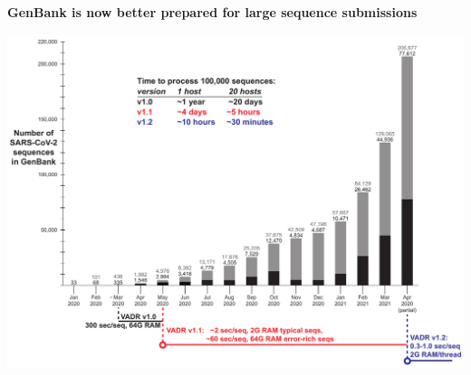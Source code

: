 \documentclass[landscape]{slides}
\begin{document}
\begin{slide}
\begin{center}
\textbf{GenBank is now better prepared for large sequence submissions}

\includegraphics[width=10.25in]{figs/sars-counts-jan2020-apr2021-slide3}
\end{center}

\vfill
\end{slide}
%
\end{document}
